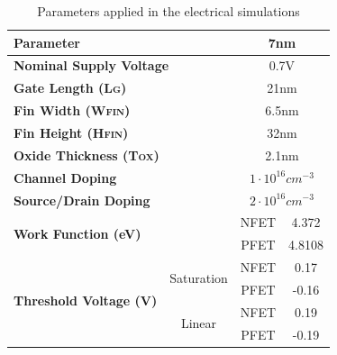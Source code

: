 \documentclass[diss,pgmicro,english]{iiufrgs}
\begin{document}
\begin{table}[]
\centering
\caption{Parameters applied in the electrical simulations \cite{clark2016asap7}}
\label{electPar}
\begin{tabular}{llccc}
\hline
\multicolumn{3}{l}{\textbf{Parameter}}                           & \multicolumn{2}{c}{\textbf{7nm}} \\ \hline
\multicolumn{3}{l}{\textbf{Nominal Supply Voltage}}              & \multicolumn{2}{c}{0.7V}         \\ \hline
\multicolumn{3}{l}{\textbf{Gate Length (L\textsc{g})}}                     & \multicolumn{2}{c}{21nm}         \\ \hline
\multicolumn{3}{l}{\textbf{Fin Width (W\textsc{fin})}}                    & \multicolumn{2}{c}{6.5nm}        \\ \hline
\multicolumn{3}{l}{\textbf{Fin Height (H\textsc{fin})}}                   & \multicolumn{2}{c}{32nm}         \\ \hline
\multicolumn{3}{l}{\textbf{Oxide Thickness (T\textsc{ox})}}               & \multicolumn{2}{c}{2.1nm}        \\ \hline
\multicolumn{3}{l}{\textbf{Channel Doping}}                                                           & \multicolumn{2}{c}{$1\cdot10^{16}cm^{-3}$} \\ \hline
\multicolumn{3}{l}{\textbf{Source/Drain Doping}}                                                      & \multicolumn{2}{c}{$2\cdot10^{16}cm^{-3}$} \\ \hline
\multicolumn{3}{l}{\multirow{2}{*}{\textbf{Work Function (eV)}}} & NFET           & 4.372           \\ \cline{4-5}
\multicolumn{3}{l}{}                                             & PFET           & 4.8108          \\ \hline
\multicolumn{2}{l}{\multirow{4}{*}{\textbf{Threshold Voltage (V)}}} & \multirow{2}{*}{Saturation}     & NFET                             & 0.17                            \\ \cline{4-5}
\multicolumn{2}{l}{}        &                                    & PFET           & -0.16           \\ \cline{3-5}
\multicolumn{2}{l}{}        & \multirow{2}{*}{Linear}            & NFET           & 0.19            \\ \cline{4-5}
\multicolumn{2}{l}{}        &                                    & PFET           & -0.19           \\ \hline
\end{tabular}
\end{table}
\end{document}
